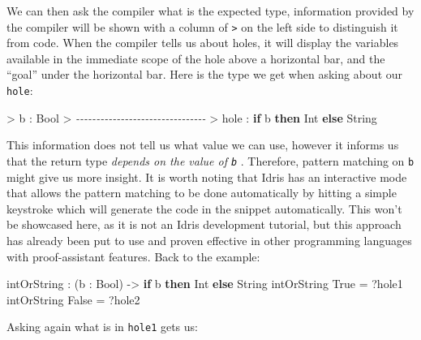 \documentclass[
]{article}
\newenvironment{Shaded}{}{}
\newcommand{\CommentTok}[1]{\textcolor[rgb]{0.38,0.63,0.69}{\textit{#1}}}
\newcommand{\DataTypeTok}[1]{\textcolor[rgb]{0.56,0.13,0.00}{#1}}
\newcommand{\KeywordTok}[1]{\textcolor[rgb]{0.00,0.44,0.13}{\textbf{#1}}}
\newcommand{\NormalTok}[1]{#1}
\newcommand{\OperatorTok}[1]{\textcolor[rgb]{0.40,0.40,0.40}{#1}}
\newcommand{\OtherTok}[1]{\textcolor[rgb]{0.00,0.44,0.13}{#1}}
\begin{document}
We can then ask the compiler what is the expected type, information
provided by the compiler will be shown with a column of
\texttt{\textgreater{}} on the left side to distinguish it from code.
When the compiler tells us about holes, it will display the variables
available in the immediate scope of the hole above a horizontal bar, and
the ``goal'' under the horizontal bar. Here is the type we get when
asking about our \texttt{hole}:

\begin{Shaded}
\begin{Highlighting}[]
\OperatorTok{\textgreater{}}\NormalTok{ b }\OperatorTok{:} \DataTypeTok{Bool}
\OperatorTok{\textgreater{}} \CommentTok{{-}{-}{-}{-}{-}{-}{-}{-}{-}{-}{-}{-}{-}{-}{-}{-}{-}{-}{-}{-}{-}{-}{-}{-}{-}{-}{-}{-}{-}{-}{-}{-}}
\OperatorTok{\textgreater{}}\NormalTok{ hole }\OperatorTok{:} \KeywordTok{if}\NormalTok{ b }\KeywordTok{then} \DataTypeTok{Int} \KeywordTok{else} \DataTypeTok{String}
\end{Highlighting}
\end{Shaded}

This information does not tell us what value we can use, however it
informs us that the return type \emph{depends on the value of
\texttt{b}} . Therefore, pattern matching on \texttt{b} might give us
more insight. It is worth noting that Idris has an interactive mode that
allows the pattern matching to be done automatically by hitting a simple
keystroke which will generate the code in the snippet automatically.
This won't be showcased here, as it is not an Idris development
tutorial, but this approach has already been put to use and proven
effective in other programming languages with proof-assistant
features\cite{tdd}\cite{agda_interactive}. Back to the example:

\begin{Shaded}
\begin{Highlighting}[]
\NormalTok{intOrString }\OperatorTok{:}\NormalTok{ (b }\OperatorTok{:} \DataTypeTok{Bool}\NormalTok{) }\OtherTok{{-}\textgreater{}} \KeywordTok{if}\NormalTok{ b }\KeywordTok{then} \DataTypeTok{Int} \KeywordTok{else} \DataTypeTok{String}
\NormalTok{intOrString }\DataTypeTok{True} \OtherTok{=} \OperatorTok{?}\NormalTok{hole1}
\NormalTok{intOrString }\DataTypeTok{False} \OtherTok{=} \OperatorTok{?}\NormalTok{hole2}
\end{Highlighting}
\end{Shaded}

Asking again what is in \texttt{hole1} gets us:
\end{document}
